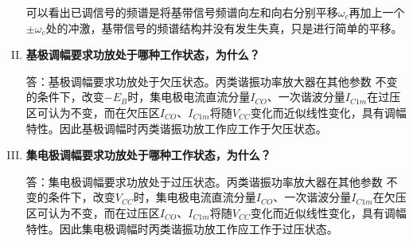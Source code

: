 \documentclass[UTF8]{ctexart}
\begin{document}
\begin{enumerate}[I.]
    可以看出已调信号的频谱是将基带信号频谱向左和向右分别平移$\omega_c$再加上一个$\pm \omega_c$处的冲激，基带信号的频谱结构并没有发生失真，只是进行简单的平移。

    \item \textbf{基极调幅要求功放处于哪种工作状态，为什么？}

    答：基极调幅要求功放处于欠压状态。丙类谐振功率放大器在其他参数
    不变的条件下，改变$-E_B$时，集电极电流直流分量$I_{CO}$、一次谐波分量$I_{C1m}$在过压区可认为不变，而在欠压区$I_{CO}$、$I_{C1m}$将随$V_{CC}$变化而近似线性变化，具有调幅特性。因此基极调幅时丙类谐振功放工作应工作于欠压状态。

    \item \textbf{集电极调幅要求功放处于哪种工作状态，为什么？}
    
    答：集电极调幅要求功放处于过压状态。丙类谐振功率放大器在其他参数
    不变的条件下，改变$V_{CC}$时，集电极电流直流分量$I_{CO}$、一次谐波分量$I_{C1m}$在欠压区可认为不变，而在过压区$I_{CO}$、$I_{C1m}$将随$V_{CC}$变化而近似线性变化，具有调幅特性。因此集电极调幅时丙类谐振功放工作应工作于过压状态。
\end{enumerate}
\end{document}
